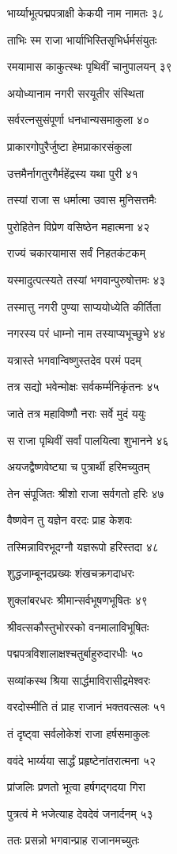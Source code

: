भार्य्याभूत्पद्मपत्राक्षी केकयी नाम नामतः ३८

ताभिः स्म राजा भार्याभिस्तिसृभिर्धर्मसंयुतः

रमयामास काकुत्स्थः पृथिवीं चानुपालयन् ३९

अयोध्यानाम नगरी सरयूतीर संस्थिता

सर्वरत्नसुसंपूर्णा धनधान्यसमाकुला ४०

प्राकारगोपुरैर्जुष्टा हेमप्राकारसंकुला

उत्तमैर्नागतुरगैर्महेंद्रस्य यथा पुरी ४१

तस्यां राजा स धर्मात्मा उवास मुनिसत्तमैः

पुरोहितेन विप्रेण वसिष्ठेन महात्मना ४२

राज्यं चकारयामास सर्वं निहतकंटकम्

यस्मादुत्पत्स्यते तस्यां भगवान्पुरुषोत्तमः ४३

तस्मात्तु नगरी पुण्या साप्ययोध्येति कीर्तिता

नगरस्य परं धाम्नो नाम तस्याप्यभूच्छुभे ४४

यत्रास्ते भगवान्विष्णुस्तदेव परमं पदम्

तत्र सद्यो भवेन्मोक्षः सर्वकर्म्मनिकृंतनः ४५

जाते तत्र महाविष्णौ नराः सर्वे मुदं ययुः

स राजा पृथिवीं सर्वां पालयित्वा शुभानने ४६

अयजद्वैष्णवेष्ट्या च पुत्रार्थी हरिमच्युतम्

तेन संपूजितः श्रीशो राजा सर्वगतो हरिः ४७

वैष्णवेन तु यज्ञेन वरदः प्राह केशवः

तस्मिन्नाविरभूदग्नौ यज्ञरूपो हरिस्तदा ४८

शुद्धजाम्बूनदप्रख्यः शंखचक्रगदाधरः

शुक्लांबरधरः श्रीमान्सर्वभूषणभूषितः ४९

श्रीवत्सकौस्तुभोरस्को वनमालाविभूषितः

पद्मपत्रविशालाक्षश्चतुर्बाहुरुदारधीः ५०

सव्यांकस्थ श्रिया सार्द्धमाविरासीद्रमेश्वरः

वरदोस्मीति तं प्राह राजानं भक्तवत्सलः ५१

तं दृष्ट्वा सर्वलोकेशं राजा हर्षसमाकुलः

ववंदे भार्य्यया सार्द्धं प्रहृष्टेनांतरात्मना ५२

प्रांजलिः प्रणतो भूत्वा हर्षगद्गदया गिरा

पुत्रत्वं मे भजेत्याह देवदेवं जनार्दनम् ५३

ततः प्रसन्नो भगवान्प्राह राजानमच्युतः


